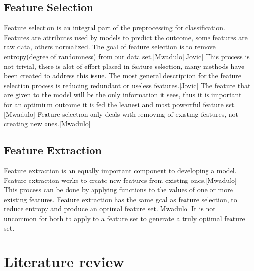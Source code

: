 \documentclass[confrence]{IEEEtran}
\begin{document}
\subsection*{Feature Selection}
Feature selection is an integral part of the preprocessing for classification. 
Features are attributes used by models to predict the outcome, some features are raw data, others normalized.
The goal of feature selection is to remove entropy(degree of randomness) from our data set.[Mwadulo][Jovic]
This process is not trivial, there is alot of effort placed in feature selection, many methods have been created to address this issue.
The most general description for the feature selection process is reducing redundant or useless features.[Jovic]
The feature that are given to the model will be the only information it sees, thus it is important for an optimium outcome it is fed the leanest and most powerrful feature set.[Mwadulo]
Feature selection only deals with removing of existing features, not creating new ones.[Mwadulo]
\subsection*{Feature Extraction}
Feature extraction is an equally important component to developing a model.
Feature extraction works to create new features from existing ones.[Mwadulo]
This process can be done by applying functions to the values of one or more existing features.
Feature extraction has the same goal as feature selection, to reduce entropy and produce an optimal feature set.[Mwadulo]
It is not uncommon for both to apply to a feature set to generate a truly optimal feature set.
\section*{Literature review}
\end{document}
